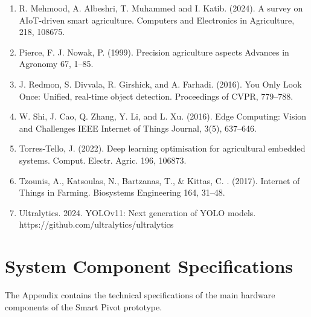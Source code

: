 \documentclass[12pt,a4paper]{report}
\begin{document}
\begin{enumerate}
    \item R. Mehmood, A. Albeshri, T. Muhammed and I. Katib. (2024). A survey on AIoT-driven smart agriculture. Computers and Electronics in Agriculture, 218, 108675.
    \item Pierce, F. J. Nowak, P. (1999). Precision agriculture aspects Advances in Agronomy 67, 1--85.
    \item J. Redmon, S. Divvala, R. Girshick, and A. Farhadi. (2016). You Only Look Once: Unified, real-time object detection. Proceedings of CVPR, 779--788.
    \item W. Shi, J. Cao, Q. Zhang, Y. Li, and L. Xu. (2016). Edge Computing: Vision and Challenges IEEE Internet of Things Journal, 3(5), 637--646.
    \item Torres-Tello, J. (2022). Deep learning optimisation for agricultural embedded systems. Comput. Electr. Agric. 196, 106873.
    \item Tzounis, A., Katsoulas, N., Bartzanas, T., \& Kittas, C. . (2017). Internet of Things in Farming. Biosystems Engineering 164, 31--48.
    \item Ultralytics. 2024. YOLOv11: Next generation of YOLO models. https://github.com/ultralytics/ultralytics
\end{enumerate}

\appendix

\chapter{System Component Specifications}
\pagestyle{fancy}
\thispagestyle{empty}

The Appendix contains the technical specifications of the main hardware components of the Smart Pivot prototype.
\end{document}
